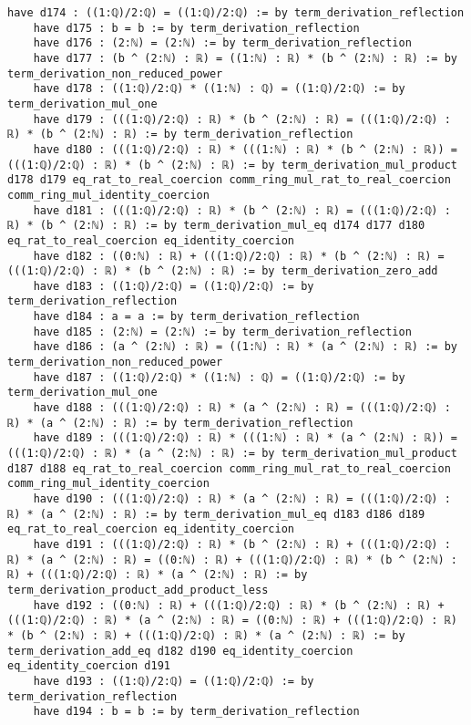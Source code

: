 \documentclass{article}
\begin{document}
\begin{tcolorbox}[colback=white!10, width=\linewidth]
\begin{lstlisting}[language=Lean4]
    have d174 : ((1:ℚ)/2:ℚ) = ((1:ℚ)/2:ℚ) := by term_derivation_reflection
    have d175 : b = b := by term_derivation_reflection
    have d176 : (2:ℕ) = (2:ℕ) := by term_derivation_reflection
    have d177 : (b ^ (2:ℕ) : ℝ) = ((1:ℕ) : ℝ) * (b ^ (2:ℕ) : ℝ) := by term_derivation_non_reduced_power
    have d178 : ((1:ℚ)/2:ℚ) * ((1:ℕ) : ℚ) = ((1:ℚ)/2:ℚ) := by term_derivation_mul_one
    have d179 : (((1:ℚ)/2:ℚ) : ℝ) * (b ^ (2:ℕ) : ℝ) = (((1:ℚ)/2:ℚ) : ℝ) * (b ^ (2:ℕ) : ℝ) := by term_derivation_reflection
    have d180 : (((1:ℚ)/2:ℚ) : ℝ) * (((1:ℕ) : ℝ) * (b ^ (2:ℕ) : ℝ)) = (((1:ℚ)/2:ℚ) : ℝ) * (b ^ (2:ℕ) : ℝ) := by term_derivation_mul_product d178 d179 eq_rat_to_real_coercion comm_ring_mul_rat_to_real_coercion comm_ring_mul_identity_coercion
    have d181 : (((1:ℚ)/2:ℚ) : ℝ) * (b ^ (2:ℕ) : ℝ) = (((1:ℚ)/2:ℚ) : ℝ) * (b ^ (2:ℕ) : ℝ) := by term_derivation_mul_eq d174 d177 d180 eq_rat_to_real_coercion eq_identity_coercion
    have d182 : ((0:ℕ) : ℝ) + (((1:ℚ)/2:ℚ) : ℝ) * (b ^ (2:ℕ) : ℝ) = (((1:ℚ)/2:ℚ) : ℝ) * (b ^ (2:ℕ) : ℝ) := by term_derivation_zero_add
    have d183 : ((1:ℚ)/2:ℚ) = ((1:ℚ)/2:ℚ) := by term_derivation_reflection
    have d184 : a = a := by term_derivation_reflection
    have d185 : (2:ℕ) = (2:ℕ) := by term_derivation_reflection
    have d186 : (a ^ (2:ℕ) : ℝ) = ((1:ℕ) : ℝ) * (a ^ (2:ℕ) : ℝ) := by term_derivation_non_reduced_power
    have d187 : ((1:ℚ)/2:ℚ) * ((1:ℕ) : ℚ) = ((1:ℚ)/2:ℚ) := by term_derivation_mul_one
    have d188 : (((1:ℚ)/2:ℚ) : ℝ) * (a ^ (2:ℕ) : ℝ) = (((1:ℚ)/2:ℚ) : ℝ) * (a ^ (2:ℕ) : ℝ) := by term_derivation_reflection
    have d189 : (((1:ℚ)/2:ℚ) : ℝ) * (((1:ℕ) : ℝ) * (a ^ (2:ℕ) : ℝ)) = (((1:ℚ)/2:ℚ) : ℝ) * (a ^ (2:ℕ) : ℝ) := by term_derivation_mul_product d187 d188 eq_rat_to_real_coercion comm_ring_mul_rat_to_real_coercion comm_ring_mul_identity_coercion
    have d190 : (((1:ℚ)/2:ℚ) : ℝ) * (a ^ (2:ℕ) : ℝ) = (((1:ℚ)/2:ℚ) : ℝ) * (a ^ (2:ℕ) : ℝ) := by term_derivation_mul_eq d183 d186 d189 eq_rat_to_real_coercion eq_identity_coercion
    have d191 : (((1:ℚ)/2:ℚ) : ℝ) * (b ^ (2:ℕ) : ℝ) + (((1:ℚ)/2:ℚ) : ℝ) * (a ^ (2:ℕ) : ℝ) = ((0:ℕ) : ℝ) + (((1:ℚ)/2:ℚ) : ℝ) * (b ^ (2:ℕ) : ℝ) + (((1:ℚ)/2:ℚ) : ℝ) * (a ^ (2:ℕ) : ℝ) := by term_derivation_product_add_product_less
    have d192 : ((0:ℕ) : ℝ) + (((1:ℚ)/2:ℚ) : ℝ) * (b ^ (2:ℕ) : ℝ) + (((1:ℚ)/2:ℚ) : ℝ) * (a ^ (2:ℕ) : ℝ) = ((0:ℕ) : ℝ) + (((1:ℚ)/2:ℚ) : ℝ) * (b ^ (2:ℕ) : ℝ) + (((1:ℚ)/2:ℚ) : ℝ) * (a ^ (2:ℕ) : ℝ) := by term_derivation_add_eq d182 d190 eq_identity_coercion eq_identity_coercion d191
    have d193 : ((1:ℚ)/2:ℚ) = ((1:ℚ)/2:ℚ) := by term_derivation_reflection
    have d194 : b = b := by term_derivation_reflection

\end{lstlisting}
\end{tcolorbox}
\end{document}
